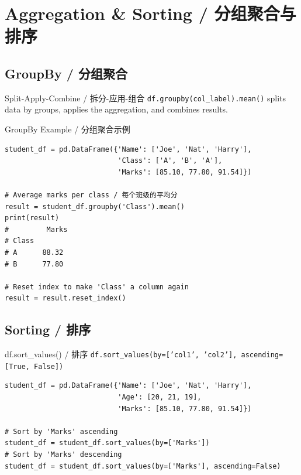 \documentclass[11pt,a4paper]{article}
\begin{document}
\section{Aggregation \& Sorting / 分组聚合与排序}

\subsection{GroupBy / 分组聚合}

\begin{concept}{Split-Apply-Combine / 拆分-应用-组合}
    \texttt{df.groupby(col\_label).mean()} splits data by groups, applies the aggregation, and combines results.
\end{concept}

\begin{examplebox}{GroupBy Example / 分组聚合示例}
\begin{lstlisting}
student_df = pd.DataFrame({'Name': ['Joe', 'Nat', 'Harry'],
                           'Class': ['A', 'B', 'A'],
                           'Marks': [85.10, 77.80, 91.54]})

# Average marks per class / 每个班级的平均分
result = student_df.groupby('Class').mean()
print(result)
#         Marks
# Class
# A      88.32
# B      77.80

# Reset index to make 'Class' a column again
result = result.reset_index()
\end{lstlisting}
\end{examplebox}

\subsection{Sorting / 排序}

\begin{examplebox}{df.sort\_values() / 排序}
    \texttt{df.sort\_values(by=['col1', 'col2'], ascending=[True, False])}
\begin{lstlisting}
student_df = pd.DataFrame({'Name': ['Joe', 'Nat', 'Harry'],
                           'Age': [20, 21, 19],
                           'Marks': [85.10, 77.80, 91.54]})

# Sort by 'Marks' ascending
student_df = student_df.sort_values(by=['Marks'])
# Sort by 'Marks' descending
student_df = student_df.sort_values(by=['Marks'], ascending=False)
\end{lstlisting}
\end{examplebox}
\end{document}
